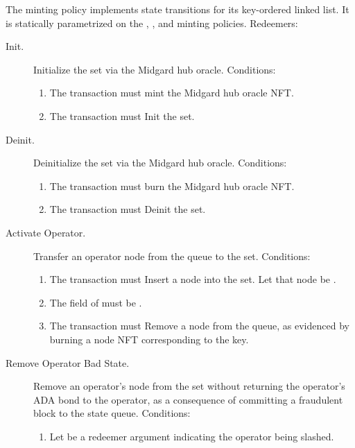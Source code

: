 \documentclass[../midgard.tex]{subfiles}
\begin{document}
The  minting policy implements state transitions for its key-ordered linked list.
It is statically parametrized on the , , and  minting policies.
Redeemers:
\begin{description}
    \item[Init.] Initialize the  set via the Midgard hub oracle.
      Conditions:
        \begin{enumerate}
            \item The transaction must mint the Midgard hub oracle NFT.
            \item The transaction must Init the  set.
        \end{enumerate}
    \item[Deinit.] Deinitialize the  set via the Midgard hub oracle.
      Conditions:
        \begin{enumerate}
            \item The transaction must burn the Midgard hub oracle NFT.
            \item The transaction must Deinit the  set.
        \end{enumerate}
    \item[Activate Operator.] Transfer an operator node from the  queue to the  set.
      Conditions:
        \begin{enumerate}
            \item The transaction must Insert a node into the  set.
              Let that node be .
            \item The  field of  must be .
            \item The transaction must Remove a node from the  queue, as evidenced by burning a  node NFT corresponding to the  key.
        \end{enumerate}
    \item[Remove Operator Bad State.] Remove an operator's node from the  set without returning the operator's ADA bond to the operator, as a consequence of committing a fraudulent block to the state queue.
      Conditions:
        \begin{enumerate}
            \item Let  be a redeemer argument indicating the operator being slashed.

\end{enumerate}
\end{description}
\end{document}
